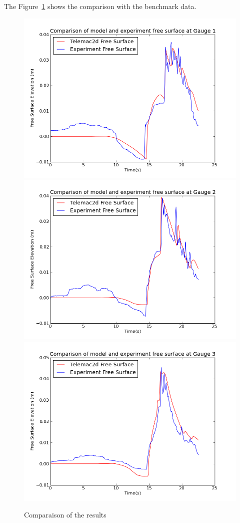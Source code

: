 The Figure~\ref{fig:monai:res} shows the comparison with the benchmark data.
\begin{figure}
\centering
\includegraphics[width=.8\textwidth]{img/res_g1.png}
\includegraphics[width=.8\textwidth]{img/res_g2.png}
\includegraphics[width=.8\textwidth]{img/res_g3.png}
\caption{Comparaison of the results}\label{fig:monai:res}
\end{figure}
